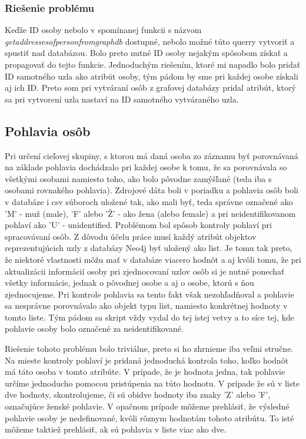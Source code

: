 \subsubsection{Riešenie problému}

Keďže ID osoby nebolo v spomínanej funkcii s názvom \textit{get\textunderscore addresses\textunderscore of\textunderscore person\textunderscore from\textunderscore graph\textunderscore db} dostupné, nebolo možné túto querry vytvoriť a spustiť nad databázou. Bolo preto nutné ID osoby nejakým spôsobom získať a propagovať do tejto funkcie. Jednoduchým riešením, ktoré mi napadlo bolo pridať ID samotného uzla ako atribút osoby, tým pádom by sme pri každej osobe získali aj ich ID. Preto som pri vytváraní osôb z grafovej databázy pridal atribút, ktorý sa pri vytvorení uzla nastaví na ID samotného vytváraného uzla.

\subsection{Pohlavia osôb}
Pri určení cieľovej skupiny, s ktorou má daná osoba zo záznamu byť porovnávaná na základe pohlavia dochádzalo pri každej osobe k tomu, že sa porovnávala so všetkými osobami namiesto toho, ako bolo pôvodne zamýšľané (teda iba s osobami rovnakého pohlavia). Zdrojové dáta boli v poriadku a pohlavia osôb boli v databáze i csv súboroch uložené tak, ako mali byť, teda správne označené ako 'M' - muž (male), 'F' alebo 'Ž' - ako žena (alebo female) a pri neidentifikovanom pohlaví ako 'U' - unidentified. Problémom bol spôsob kontroly pohlaví pri spracovávaní osôb. Z dôvodu účelu práce musí každý atribút objektov reprezentujúcich uzly z databázy Neo4j byť uložený ako list. Je tomu tak preto, že niektoré vlastnosti môžu mať v databáze viacero hodnôt a aj kvôli tomu, že pri aktualizácii informácií osoby pri zjednocovaní uzlov osôb si je nutné ponechať všetky informácie, jednak o pôvodnej osobe a aj o osobe, ktorú s ňou zjednocujeme. Pri kontrole pohlavia sa tento fakt však nezohľadňoval a pohlavie sa nesprávne porovnávalo ako objekt typu list, namiesto konkrétnej hodnoty v tomto liste. Tým pádom sa skript vždy vydal do tej istej vetvy a to síce tej, kde pohlavie osoby bolo označené za neidentifikované.
\newline

Riešenie tohoto problému bolo triviálne, preto si ho zhrnieme iba veľmi stručne. Na mieste kontroly pohlaví je pridaná jednoduchá kontrola toho, koľko hodnôt má táto osoba v tomto atribúte. V prípade, že je hodnota jedna, tak pohlavie určíme jednoducho pomocou pristúpenia na túto hodnotu. V prípade že sú v liste dve hodnoty, skontrolujeme, či sú obidve hodnoty iba znaky 'Z' alebo 'F', označujúce ženské pohlavie. V opačnom prípade môžeme prehlásiť, že výsledné pohlavie osoby je nedefinované, kvôli rôznym hodnotám tohoto atribútu. To isté môžeme taktiež prehlásiť, ak sú pohlavia v liste viac ako dve.

